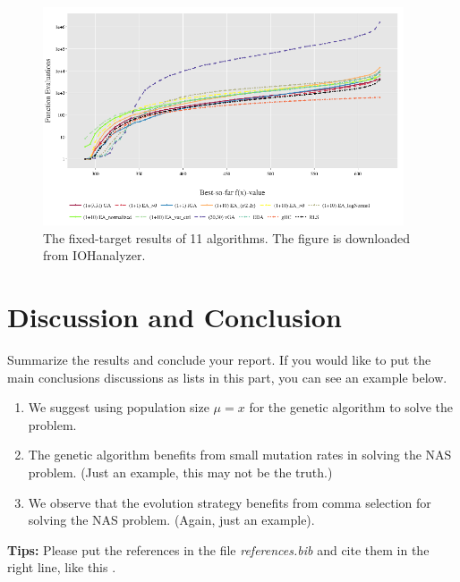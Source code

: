 \documentclass{article}
\begin{document}
\begin{figure}[!ht]
 \begin{center}    \includegraphics[width=0.95\textwidth]{best-so-far.png}
 \end{center}
 \caption{The fixed-target results of 11 algorithms. The figure is downloaded from IOHanalyzer.}
 \label{fig:test}
\end{figure}

\section{Discussion and Conclusion}\label{sec:dis&res}

Summarize the results and conclude your report. If you would like to put the main conclusions discussions as lists in this part, you can see an example below.

\begin{enumerate}[1)]
    \item We suggest using population size $\mu=x$ for the genetic algorithm to solve the problem.
    
    \item The genetic algorithm benefits from small mutation rates in solving the \textsc{NAS} problem. (Just an example, this may not be the truth.)
    
    \item We observe that the evolution strategy benefits from comma selection for solving the \textsc{NAS} problem. (Again, just an example).
\end{enumerate}
 
 \textbf{Tips:} Please put the references in the file \emph{references.bib} and cite them in the right line, like this \cite{hadash2018estimate}.

  
  
\end{document}
